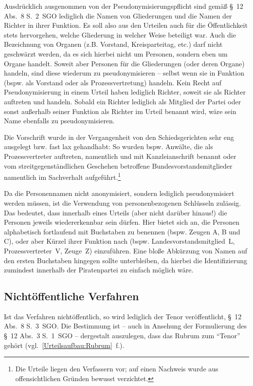 Ausdrücklich ausgenommen von der Pseudonymisierungspflicht sind gemäß \S~12 Abs.~8 S.~2~SGO lediglich die Namen von Gliederungen und die Namen der Richter in ihrer Funktion.
Es soll also aus den Urteilen auch für die Öffentlichkeit stets hervorgehen, welche Gliederung in welcher Weise beteiligt war.
Auch die Bezeichnung von Organen (z.B. Vorstand, Kreisparteitag, etc.) darf nicht geschwärzt werden, da es sich hierbei nicht um Personen, sondern eben um Organe handelt.
Soweit aber Personen für die Gliederungen (oder deren Organe) handeln, sind diese wiederum zu pseudonymisieren -- selbst wenn sie in Funktion (bspw. als Vorstand oder als Prozessvertretung) handeln.
Kein Recht auf Pseudonymisierung in einem Urteil haben lediglich Richter, soweit sie als Richter auftreten und handeln.
Sobald ein Richter lediglich als Mitglied der Partei oder sonst außerhalb seiner Funktion als Richter im Urteil benannt wird, wäre sein Name ebenfalls zu pseudonymisieren.

Die Vorschrift wurde in der Vergangenheit von den Schiedsgerichten sehr eng ausgelegt bzw. fast lax gehandhabt:
So wurden bspw. Anwälte, die als Prozessvertreter auftreten, namentlich und mit Kanzleianschrift benannt oder vom streitgegenständlichen Geschehen betroffene Bundesvorstandsmitglieder namentlich im Sachverhalt aufgeführt.\footnote{Die Urteile liegen den Verfassern vor; auf einen Nachweis wurde aus offensichtlichen Gründen bewusst verzichtet.}

Da die Personennamen nicht anonymisiert, sondern lediglich pseudonymisiert werden müssen, ist die Verwendung von personenbezogenen Schlüsseln zulässig.
Das bedeutet, dass innerhalb eines Urteils (aber nicht darüber hinaus!) die Personen jeweils wiedererkennbar sein dürfen.
Hier bietet sich an, die Personen alphabetisch fortlaufend mit Buchstaben zu benennen (bspw. Zeugen A, B und C), oder aber Kürzel ihrer Funktion nach (bspw. Landesvorstandsmitglied~L, Prozessvertreter~V, Zeuge~Z) einzuführen.
Eine bloße Abkürzung von Namen auf den ersten Buchstaben hingegen sollte unterbleiben, da hierbei die Identifizierung zumindest innerhalb der Piratenpartei zu einfach möglich wäre.

\subsection{Nichtöffentliche Verfahren}
\label{Dokumentation:Urteile:Nichtöffentlich}
Ist das Verfahren nichtöffentlich, so wird lediglich der Tenor veröffentlicht, \S~12 Abs.~8 S.~3~SGO.
Die Bestimmung ist -- auch in Ansehung der Formulierung des \S~12 Abs.~3 S.~1~SGO -- dergestalt auszulegen, dass das Rubrum zum \enquote{Tenor} gehört (vgl.~\ref{Urteilsaufbau:Rubrum}~f.).

